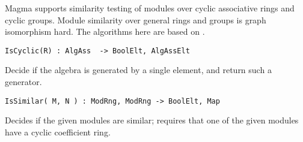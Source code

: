 
Magma supports similarity testing of modules over cyclic associative rings and cyclic groups.
Module similarity over general rings and groups is graph isomorphism hard.  The algorithms
here are based on \cite{BW:Module-iso}.

\color{blue}
{\small \begin{verbatim}
IsCyclic(R) : AlgAss  -> BoolElt, AlgAssElt
\end{verbatim}}
\color{black}

Decide if the algebra is generated by a single element, and return such a generator.

\color{blue}
{\small \begin{verbatim}
IsSimilar( M, N ) : ModRng, ModRng -> BoolElt, Map
\end{verbatim}}
\color{black}

Decides if the given modules are similar; requires that one of the given modules have a cyclic coefficient ring.

